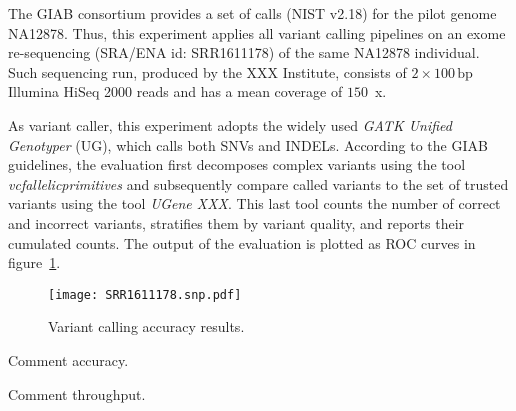 The GIAB consortium provides a set of calls (NIST v2.18) for the pilot genome NA12878.
Thus, this experiment applies all variant calling pipelines on an exome re-sequencing (SRA/ENA id: SRR1611178) of the same NA12878 individual.
Such sequencing run, produced by the XXX Institute, consists of $2 \times 100\,\text{bp}$ Illumina HiSeq 2000 reads and has a mean coverage of $150$~x.

As variant caller, this experiment adopts the widely used \emph{GATK Unified Genotyper} (UG), which calls both SNVs and INDELs.
According to the GIAB guidelines, the evaluation first decomposes complex variants using the tool \emph{vcfallelicprimitives} and subsequently compare called variants to the set of trusted variants using the tool \emph{UGene XXX}.
This last tool counts the number of correct and incorrect variants, stratifies them by variant quality, and reports their cumulated counts.
The output of the evaluation is plotted as ROC curves in figure~\ref{fig:yara:calling-snps}.

\begin{figure}[t]
\begin{center}
\caption[Variant calling accuracy results]{Variant calling accuracy results.}
\label{fig:yara:calling-snps}
\texttt{[image: SRR1611178.snp.pdf]}
\end{center}
\end{figure}

Comment accuracy.

Comment throughput.





